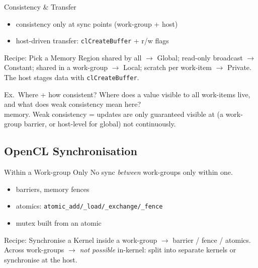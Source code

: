 \begin{concept}{Consistency \& Transfer}
    \begin{itemize}
        \item {} consistency only at sync points (work-group + host)
        \item host-driven transfer: \texttt{clCreateBuffer} + r/w flags
    \end{itemize}
\end{concept}

\multend

\begin{KR}{Recipe: Pick a Memory Region}
    shared by all $\to$ Global; read-only broadcast $\to$ Constant; shared in a work-group $\to$ Local; scratch per work-item $\to$ Private. The host stages data with \texttt{clCreateBuffer}.
\end{KR}

\begin{example2}{Ex.\ Where + how consistent?}
    Where does a value visible to all work-items live, and what does weak consistency mean here?
     \\ 
     memory. Weak consistency = updates are only guaranteed visible at  (a work-group barrier, or host-level for global) not continuously.
\end{example2}

\subsection{OpenCL Synchronisation}

\begin{definition}{Within a Work-group Only}
    No sync \emph{between} work-groups only within one.
    \begin{itemize}
        \item barriers, memory fences
        \item atomics: \texttt{atomic\_add/\_load/\_exchange/\_fence}
        \item mutex built from an atomic
    \end{itemize}
\end{definition}

\begin{KR}{Recipe: Synchronise a Kernel}
    inside a work-group $\to$ barrier / fence / atomics. Across work-groups $\to$ \emph{not possible} in-kernel: split into separate kernels or synchronise at the host.
\end{KR}

